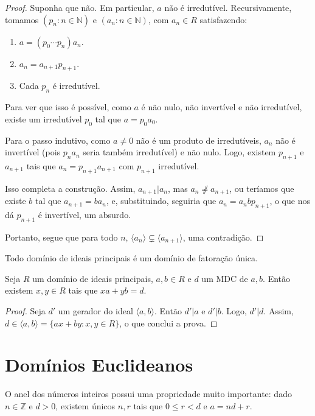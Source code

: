 \begin{proof}
    Suponha que não.
    Em particular, $a$ não é irredutível.
    Recursivamente, tomamos $(p_n: n \in \mathbb N)$ e $(a_n: n \in \mathbb N)$, com $a_n\in R$ satisfazendo:
    \begin{enumerate}[label=\alph*)]
        \item $a=(p_0\cdots p_n) a_n$.
        \item $a_{n}=a_{n+1}p_{n+1}$.
        \item Cada $p_n$ é irredutível.
    \end{enumerate}
    Para ver que isso é possível, como $a$ é não nulo, não invertível e não irredutível, existe um irredutível $p_0$ tal que $a=p_0a_0$.
    
    Para o passo indutivo, como $a\neq 0$ não é um produto de irredutíveis, $a_n$ não é invertível (pois $p_na_n$ seria também irredutível) e não nulo.
    Logo, existem $p_{n+1}$ e $a_{n+1}$ tais que $a_n=p_{n+1}a_{n+1}$ com $p_{n+1}$ irredutível.

    Isso completa a construção.
    Assim, $a_{n+1}|a_{n}$, mas $a_{n}\not \neq a_{n+1}$, ou teríamos que existe $b$ tal que $a_{n+1}=ba_n$, e, substituindo, seguiria que $a_n=a_nbp_{n+1}$, o que nos dá $p_{n+1}$ é invertível, um absurdo.

    Portanto, segue que para todo $n$, $\langle a_n\rangle\subsetneq \langle a_{n+1}\rangle$, uma contradição.
\end{proof}

\begin{corol}
    Todo domínio de ideais principais é um domínio de fatoração única.
\end{corol}

\begin{prop}
    Seja $R$ um domínio de ideais principais, $a, b \in R$ e $d$ um MDC de $a, b$.
    Então existem $x, y \in R$ tais que $xa+yb=d$.
\end{prop}
\begin{proof}
    Seja $d'$ um gerador do ideal $\langle a, b\rangle$.
    Então $d'|a$ e $d'|b$.
    Logo, $d'|d$.
    Assim, $d \in \langle a, b\rangle=\{ax+by: x, y \in R\}$, o que conclui a prova.
\end{proof}
\section{Domínios Euclideanos}
O anel dos números inteiros possui uma propriedade muito importante:
dado $n\in \mathbb Z$ e $d>0$, existem únicos $n, r$ tais que $0\leq r < d$ e $a=nd+r$.

